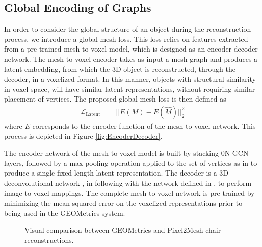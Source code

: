 \documentclass{article}
\begin{document}
\subsection{Global Encoding of Graphs}
In order to consider the global structure of an object during the reconstruction process, we introduce a global mesh loss. This loss relies on features extracted from a pre-trained mesh-to-voxel model, which is designed as an encoder-decoder network. The mesh-to-voxel encoder takes as input a mesh graph and produces a latent embedding, from which the 3D object is reconstructed, through the decoder, in a voxelized format. In this manner, objects with structural similarity in voxel space, will have similar latent representations, without requiring similar placement of vertices. The proposed global mesh loss is then defined as
\begin{equation}
\begin{split}
 \mathcal{L}_{\text{Latent}} &= || E(M) - E(\hat M)||^2_2 
\end{split}
\end{equation}
where $E$ corresponds to the encoder function of the mesh-to-voxel network. This process is depicted in  Figure \ref{fig:EncoderDecoder}. 

The encoder network of the mesh-to-voxel model is built by stacking 0N-GCN layers, followed by a max pooling operation applied to the set of vertices as in \citet{maxpooling} to produce a single fixed length latent representation. The decoder is a 3D deconvolutional network \cite{choy20163d}, in following with the network defined in \citet{mine}, to perform image to voxel mappings. The complete mesh-to-voxel network is pre-trained by minimizing the mean squared error on the voxelized representations prior to being used in the GEOMetrics system.


\begin{figure}[t!]
\captionsetup[subfloat]{captionskip=0pt}
\centering
{}\quad
{}\quad
{}
\caption{Visual comparison between GEOMetrics and Pixel2Mesh \cite{Pixel2Mesh} chair reconstructions.}
\label{fig:Pixel_compare}

\end{figure}
\end{document}
